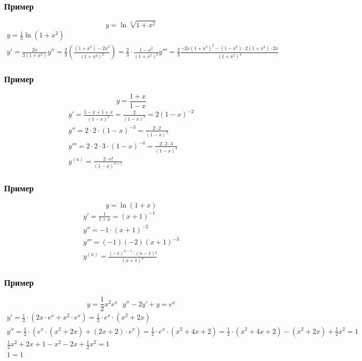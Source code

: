 \documentclass{article}
\begin{document}
\subsubsection{Пример}
\[
    y = \ln \sqrt[3]{1 + x^2}
\]
\begin{gather*}
    y    = \frac{1}{3} \ln (1 + x^2) \\
    y'   = \frac{2x}{3(1 + x^2)}
    y''  = \frac{2}{3} \left( \frac{(1 + x^2) - 2x^2}{(1 + x^2)^2} \right) =
    \frac{2}{3} \cdot \frac{1 - x^2}{(1 + x^2)^2}
    y''' = \frac{2}{3} \frac{-2x(1 + x^2)^2 - (1 - x^2) \cdot 2 (1 + x^2) \cdot 2x}{(1 + x^2)^4}
\end{gather*}

\subsubsection{Пример}
\[
    y = \frac{1 + x}{1 - x}
\]
\begin{gather*}
    y'      = \frac{1 - x + 1 + x}{(1 - x)^2} = \frac{2}{(1 - x)^2} = 2(1 - x)^{-2} \\
    y''     = 2 \cdot 2 \cdot (1 - x)^{-3}  = \frac{2 \cdot 2}{(1 - x)^3} \\
    y'''    = 2 \cdot 2 \cdot 3 \cdot (1 - x)^{-4} = \frac{2 \cdot 2 \cdot 3}{(1 - x)^4} \\
    y^{(n)} = \frac{2 \cdot n!}{(1 - x)^{n + 1}}
\end{gather*}

\subsubsection{Пример}
\[
    y = \ln (1 + x)
\]
\begin{gather*}
    y'   = \frac{1}{1 + x} = (x + 1)^{-1} \\
    y''  = -1 \cdot (x + 1)^{-2} \\
    y''' = (-1)(-2)(x + 1)^{-3} \\
    y^{(n)} = \frac{(-1)^{n - 1} \cdot (n - 1)!}{(x + 1)^n}
\end{gather*}

\subsubsection{Пример}
\[
    y = \frac{1}{2} x^2 e^x ~~~ y'' - 2y' + y = e^x
\]
\begin{gather*}
    y' = \frac{1}{2} \cdot \left( 2x \cdot e^x + x^2 \cdot e^x \right) =
    \frac{1}{2} \cdot e^x \cdot \left( x^2 + 2x \right) \\
    y '' = \frac{1}{2} \cdot \left( e^x \cdot (x^2 + 2x) + (2x + 2) \cdot e^x \right) =
    \frac{1}{2} \cdot e^x \cdot \left( x^2 + 4x + 2 \right) =
    \frac{1}{2} \cdot \left( x^2 + 4x + 2 \right) - (x^2 + 2x) + \frac{1}{2} x^2 = 1 \\
    \frac{1}{2} x^2 + 2x + 1 - x^2 - 2x + \frac{1}{2} x^2 = 1 \\
    1 = 1
\end{gather*}
\end{document}
